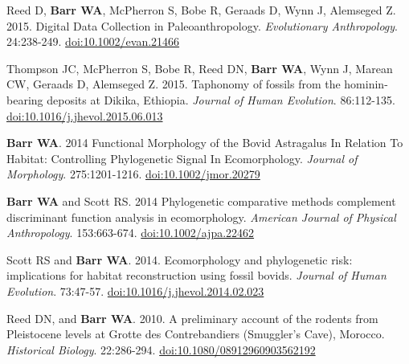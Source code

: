 \documentclass{article}
\newenvironment{mylist}
{\begin{description}[style=unboxed,leftmargin=1.3cm]}
{\end{description}}
\begin{document}
\begin{etaremune}
\item  Reed D, {\bfseries Barr WA}, McPherron S, Bobe R, Geraads D, Wynn J, Alemseged Z. 2015. Digital Data Collection in Paleoanthropology. \emph{Evolutionary Anthropology}. 24:238-249. \href{http://dx.doi.org/10.1002/evan.21466}{doi:10.1002/evan.21466}
\item  Thompson JC, McPherron S, Bobe R, Reed DN, {\bfseries Barr WA}, Wynn J, Marean CW, Geraads D, Alemseged Z. 2015. Taphonomy of fossils from the hominin-bearing deposits at Dikika, Ethiopia. \emph{Journal of Human Evolution}. 86:112-135. \href{http://dx.doi.org/10.1016/j.jhevol.2015.06.013}{doi:10.1016/j.jhevol.2015.06.013}
\item  {\bfseries Barr WA}. 2014 Functional Morphology of the Bovid Astragalus In Relation To Habitat: Controlling Phylogenetic Signal In Ecomorphology. \emph{Journal of Morphology}. 275:1201-1216. \href{http://dx.doi.org/10.1002/jmor.20279}{doi:10.1002/jmor.20279}
\item  {\bfseries Barr WA} and Scott RS. 2014 Phylogenetic comparative methods complement discriminant function analysis in ecomorphology. \emph{American Journal of Physical Anthropology}. 153:663-674. \href{http://dx.doi.org/10.1002/ajpa.22462}{doi:10.1002/ajpa.22462}
\item  Scott RS and {\bfseries Barr WA}. 2014. Ecomorphology and phylogenetic risk: implications for habitat reconstruction using fossil bovids. \emph{Journal of Human Evolution}. 73:47-57. \href{http://dx.doi.org/10.1016/j.jhevol.2014.02.023}{doi:10.1016/j.jhevol.2014.02.023}
\item  Reed DN, and {\bfseries Barr WA}. 2010. A preliminary account of the rodents from Pleistocene levels at Grotte des Contrebandiers (Smuggler's Cave), Morocco. \emph{Historical Biology}. 22:286-294. \href{http://dx.doi.org/10.1080/08912960903562192}{doi:10.1080/08912960903562192}

\end{etaremune}


\begin{comment}
\begin{mylist}
\item[] {\bfseries In Prep}

\item[] {\bfseries Barr WA}.  Beyond 'Mosaic': mammalian functional diversity and habitat heterogeneity in human evolution. To be submitted to \emph{Journal of Human Evolution}.

\end{mylist}
\end{comment}
\end{document}
